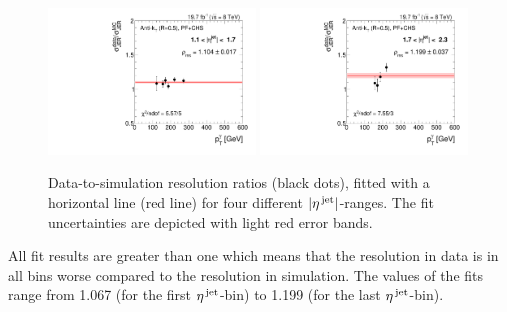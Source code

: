 \begin{figure}[!t]
    \includegraphics[width=0.49\textwidth]{figures/resolution/results/Ratio_Resolution_for_3_eta_bin_PFCHS_data_comparison_RMS99.pdf}
    \includegraphics[width=0.49\textwidth]{figures/resolution/results/Ratio_Resolution_for_4_eta_bin_PFCHS_data_comparison_RMS99.pdf}
  \caption{Data-to-simulation resolution ratios (black dots), fitted with a horizontal line (red line) for four different $|{\eta}^{\text{\,jet}}|$-ranges.
           The fit uncertainties are depicted with light red error bands.}
  \label{res:fig:RatioEtaBinned}
\end{figure}

All fit results are greater than one which means that the resolution in data is in all bins worse compared to the resolution in simulation.
The values of the fits range from 1.067 (for the first ${\eta}^{\text{\,jet}}$-bin) to 1.199 (for the last ${\eta}^{\text{\,jet}}$-bin). 

